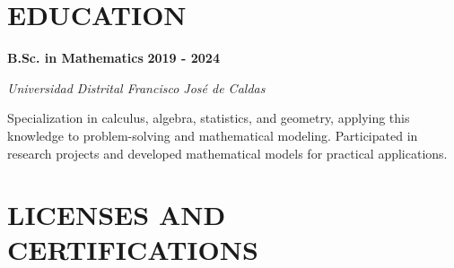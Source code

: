 \documentclass[paper=a4,fontsize=11pt]{scrartcl} %
\newcommand{\sepspace}{\vspace*{0.8em}}
\newcommand{\NewPart}[1]{\section*{\uppercase{#1}}}
\newcommand{\EducationEntry}[4]{%
  \noindent \textbf{#1} \hfill \textbf{#2} \par
  \noindent \textit{#3} \par
  \noindent \small #4 
  \normalsize \par \sepspace
}
\begin{document}
\sepspace

\NewPart{Education}

\EducationEntry{B.Sc. in Mathematics}{2019 - 2024}{Universidad Distrital Francisco José de Caldas}{%
Specialization in calculus, algebra, statistics, and geometry, applying this knowledge to problem-solving and mathematical modeling. Participated in research projects and developed mathematical models for practical applications.
}

\sepspace

\NewPart{Licenses and Certifications}
\end{document}
